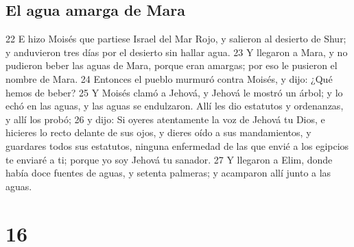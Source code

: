 \section{El agua amarga de Mara}
22 E hizo Moisés que partiese Israel del Mar Rojo, y salieron al desierto de Shur; y anduvieron tres días por el desierto sin hallar agua.
23 Y llegaron a Mara, y no pudieron beber las aguas de Mara, porque eran amargas; por eso le pusieron el nombre de Mara.
24 Entonces el pueblo murmuró contra Moisés, y dijo: ¿Qué hemos de beber?
25 Y Moisés clamó a Jehová, y Jehová le mostró un árbol; y lo echó en las aguas, y las aguas se endulzaron. Allí les dio estatutos y ordenanzas, y allí los probó;
26 y dijo: Si oyeres atentamente la voz de Jehová tu Dios, e hicieres lo recto delante de sus ojos, y dieres oído a sus mandamientos, y guardares todos sus estatutos, ninguna enfermedad de las que envié a los egipcios te enviaré a ti; porque yo soy Jehová tu sanador.
27 Y llegaron a Elim, donde había doce fuentes de aguas, y setenta palmeras; y acamparon allí junto a las aguas.

\chapter{16}

